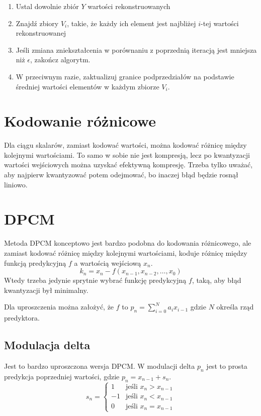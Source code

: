 \documentclass{../notatki}
\begin{document}
\begin{enumerate}
\item Ustal dowolnie zbiór $Y$ wartości rekonstruowanych
\item Znajdź zbiory $V_i$, takie, że każdy ich element jest najbliżej $i$-tej
wartości rekonstruowanej
\item Jeśli zmiana zniekształcenia w porównaniu z poprzednią iteracją
jest mniejsza
niż $\epsilon$, zakończ algorytm.
\item W przeciwnym razie, zaktualizuj granice podprzedziałów na podstawie
średniej wartości elementów w każdym zbiorze $V_i$.
\end{enumerate}

\section{Kodowanie różnicowe}

Dla ciągu skalarów, zamiast kodować wartości, można kodować różnicę między
kolejnymi wartościami. To samo w sobie nie jest kompresją, lecz po kwantyzacji
wartości wejściowych można uzyskać efektywną kompresję. Trzeba tylko uważać,
aby najpierw kwantyzować potem odejmować, bo inaczej błąd będzie rosnął liniowo.

\section{DPCM}

Metoda DPCM konceptowo jest bardzo podobna do kodowania różnicowego, ale zamiast
kodować różnicę między kolejnymi wartościami, koduje różnicę między funkcją
predykcyjną $f$ a wartością wejściową $x_n$.
$$
k_n = x_n -f(x_{n-1}, x_{n-2}, \dots, x_{0})
$$
Wtedy trzeba jedynie sprytnie wybrać funkcję predykcyjną $f$, taką, aby
błąd kwantyzacji był minimalny.

Dla uproszczenia można założyć, że $f$ to $p_n = \sum_{i=0}^{N} a_i x_{i - 1}$
gdzie $N$ określa rząd predyktora.

\subsection{Modulacja delta}

Jest to bardzo uproszczona wersja DPCM. W modulacji delta $p_n$ jest to
prosta predykcja poprzedniej wartości, gdzie $p_n = x_{n-1} + s_n$.
$$
s_n =
\begin{cases}
1 & \text{jeśli } x_n > x_{n-1} \\
-1 & \text{jeśli } x_n < x_{n-1} \\
0 & \text{jeśli } x_n = x_{n-1}
\end{cases}
$$
\end{document}
